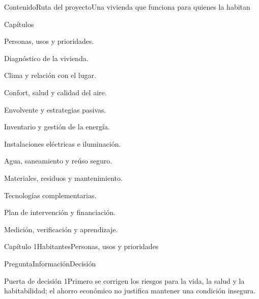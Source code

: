 \documentclass{../plantilla/hvtbook}
\begin{document}
\HVTMakeTitle

\begin{HVTPage}{Contenido}{Ruta del proyecto}{Una vivienda que funciona para quienes la habitan}
\begin{HVTTaskOrdered}{Capítulos}
\item Personas, usos y prioridades. \item Diagnóstico de la vivienda. \item Clima y relación con el lugar. \item Confort, salud y calidad del aire. \item Envolvente y estrategias pasivas. \item Inventario y gestión de la energía. \item Instalaciones eléctricas e iluminación. \item Agua, saneamiento y reúso seguro. \item Materiales, residuos y mantenimiento. \item Tecnologías complementarias. \item Plan de intervención y financiación. \item Medición, verificación y aprendizaje.
\end{HVTTaskOrdered}
\end{HVTPage}

\begin{HVTPage}{Capítulo 1}{Habitantes}{Personas, usos y prioridades}
\begin{HVTTable}{Pregunta}{Información}{Decisión}
\end{HVTTable}
\begin{HVTWarning}{Puerta de decisión 1}Primero se corrigen los riesgos para la vida, la salud y la habitabilidad; el ahorro económico no justifica mantener una condición insegura.\end{HVTWarning}
\end{HVTPage}
\end{document}
